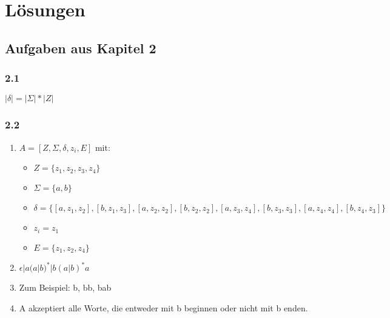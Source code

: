 \section{Lösungen}

\subsection*{Aufgaben aus Kapitel 2}
\subsubsection*{2.1}

$|\delta| = |\Sigma| * |Z|$\\


\subsubsection*{2.2}

\begin{enumerate}[label=(\alph*)]
    \item $A = [Z,  \Sigma, \delta, z_i, E]$ mit:
        \begin{itemize}
            \item $Z = \{z_1, z_2, z_3, z_4\}$
            \item $\Sigma = \{a,b\}$
            \item $\delta = \{
                    [a, z_1, z_2], [b, z_1, z_3],
                    [a, z_2, z_2], [b, z_2, z_2],
                    [a, z_3, z_4], [b, z_3, z_3],
                    [a, z_4, z_4], [b, z_4, z_3]
                \}$
            \item $z_i = z_1$
            \item $E = \{z_1, z_2, z_4\}$
        \end{itemize}

    \item $\epsilon|a(a|b)^*|b(a|b)^*a$

    \item Zum Beispiel: b, bb, bab

    \item A akzeptiert alle Worte, die entweder mit b beginnen oder nicht mit b enden.
\end{enumerate}

